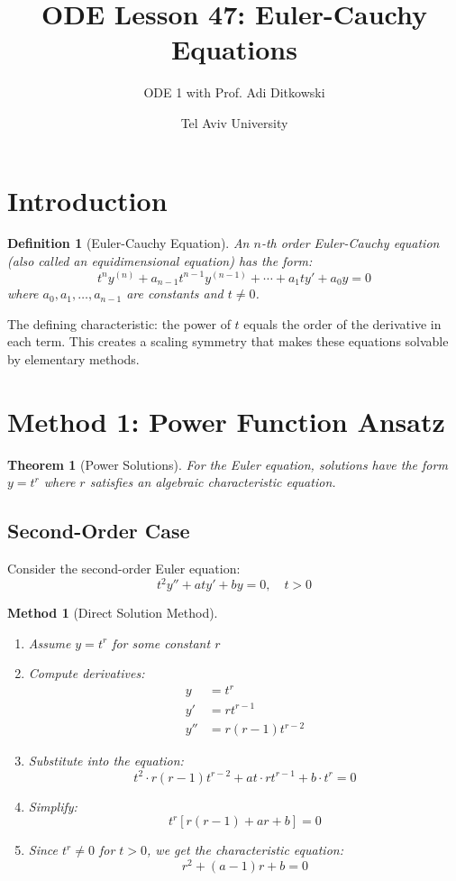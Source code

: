 \documentclass[12pt]{article}
\title{ODE Lesson 47: Euler-Cauchy Equations}
\author{ODE 1 with Prof. Adi Ditkowski}
\date{Tel Aviv University}
\newtheorem{definition}{Definition}
\newtheorem{theorem}{Theorem}
\newtheorem{method}{Method}
\begin{document}
\maketitle

\section{Introduction}

\begin{definition}[Euler-Cauchy Equation]
An $n$-th order Euler-Cauchy equation (also called an equidimensional equation) has the form:
$$t^{n} y^{(n)} + a_{n-1} t^{n-1} y^{(n-1)} + \cdots + a_{1} t y' + a_{0} y = 0$$
where $a_{0}, a_{1}, \ldots, a_{n-1}$ are constants and $t \neq 0$.
\end{definition}

\begin{keypoint}
The defining characteristic: the power of $t$ equals the order of the derivative in each term. This creates a scaling symmetry that makes these equations solvable by elementary methods.
\end{keypoint}

\section{Method 1: Power Function Ansatz}

\begin{theorem}[Power Solutions]
For the Euler equation, solutions have the form $y = t^{r}$ where $r$ satisfies an algebraic characteristic equation.
\end{theorem}

\subsection{Second-Order Case}

Consider the second-order Euler equation:
$$t^{2} y'' + a t y' + b y = 0, \quad t > 0$$

\begin{method}[Direct Solution Method]
\begin{enumerate}
    \item Assume $y = t^{r}$ for some constant $r$
    \item Compute derivatives:
    \begin{align}
    y &= t^{r} \\
    y' &= r t^{r-1} \\
    y'' &= r(r-1) t^{r-2}
    \end{align}
    \item Substitute into the equation:
    $$t^{2} \cdot r(r-1)t^{r-2} + at \cdot rt^{r-1} + b \cdot t^{r} = 0$$
    \item Simplify:
    $$t^{r}[r(r-1) + ar + b] = 0$$
    \item Since $t^{r} \neq 0$ for $t > 0$, we get the characteristic equation:
    $$r^{2} + (a-1)r + b = 0$$
\end{enumerate}
\end{method}
\end{document}
